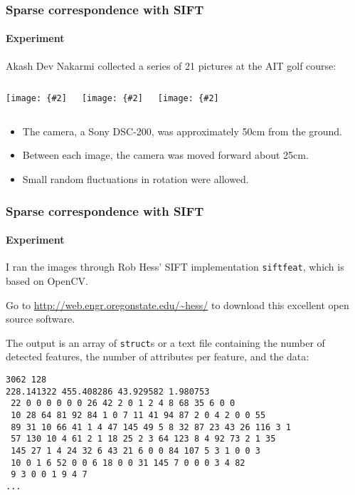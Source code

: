 \documentclass[aspectratio=169]{beamer}
\newcommand{\myfig}[3]{\centerline{\texttt{[image: \{\#2]}}}
    \centerline{\scriptsize #3}}
\begin{document}
\begin{frame}
\frametitle{Sparse correspondence with SIFT}
\framesubtitle{Experiment}

Akash Dev Nakarmi collected a series of 21 pictures at the AIT golf
course:

\medskip

\begin{columns}

\column{1.5in}
\myfig{1.4in}{Golf0}{}

\column{1.5in}
\myfig{1.4in}{Golf1}{}

\column{1.5in}
\myfig{1.4in}{Golf2}{}

\end{columns}

\begin{itemize}
\item The camera, a Sony DSC-200, was approximately 50cm from the ground.
\item Between each image, the camera was moved forward about 25cm.
\item Small random fluctuations in rotation were allowed.
\end{itemize}

\end{frame}

\begin{frame}[fragile]
\frametitle{Sparse correspondence with SIFT}
\framesubtitle{Experiment}

I ran the images through Rob Hess' SIFT implementation {\tt siftfeat},
which is based on OpenCV.

\medskip

Go to \url{http://web.engr.oregonstate.edu/~hess/} to download this
excellent open source software.

\medskip

The output is an array of {\tt struct}s or a text file containing the
number of detected features, the number of attributes per feature, and
the data:

\medskip

{\scriptsize
\begin{lstlisting}
3062 128
228.141322 455.408286 43.929582 1.980753
 22 0 0 0 0 0 0 26 42 2 0 1 2 4 8 68 35 6 0 0
 10 28 64 81 92 84 1 0 7 11 41 94 87 2 0 4 2 0 0 55
 89 31 10 66 41 1 4 47 145 49 5 8 32 87 23 43 26 116 3 1
 57 130 10 4 61 2 1 18 25 2 3 64 123 8 4 92 73 2 1 35
 145 27 1 4 24 32 6 43 21 6 0 0 84 107 5 3 1 0 0 3
 10 0 1 6 52 0 0 6 18 0 0 31 145 7 0 0 0 3 4 82
 9 3 0 0 1 9 4 7
...
\end{lstlisting}}

\end{frame}
\end{document}
